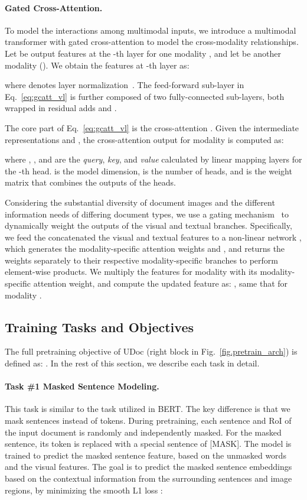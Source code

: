 \documentclass{article}
\begin{document}
	\paragraph{Gated Cross-Attention.}
	To model the {interactions among} multimodal inputs, we introduce {a} multimodal transformer {with gated cross-attention to model the cross-modality relationships.}
	{Let  be output features at the -th layer for one modality , and {let}  be another modality (). We obtain the features at -th layer as}:
	
	{where  denotes layer normalization~\cite{ba2016layer}}.
	{The feed-forward sub-layer  in Eq.~\ref{eq:gcatt_vl} is further composed of two fully-connected sub-layers, both wrapped in residual adds and .}
	
	The core part of Eq.~\ref{eq:gcatt_vl} is the cross-attention . Given the intermediate representations  and , the cross-attention output for modality  is computed as:
	
	{where , , and  are the {\textit{query}}, {\textit{key}}, and {\textit{value}} calculated by linear mapping layers for the -th head.  is the model dimension,  is the number of heads, and  is the weight matrix that combines the outputs of the heads.}
	
	Considering the {substantial diversity} of document images {and {the different information needs of differing} document types}, we use a gating mechanism~\cite{hu2018squeeze} to {dynamically weight} the outputs {of {the} visual and textual branches}. Specifically, {we feed the concatenated the visual and textual features to a non-linear network} , {which generates the modality-specific attention weights}  and , and returns the weights separately to {their respective modality-specific branches to perform element-wise products. We multiply the features for modality  with its modality-specific attention weight, and compute the {updated} feature as: , same that for modality .}
	
	\subsection{Training Tasks and Objectives}\label{sec:pre_training_tasks}
	The full pretraining objective of UDoc (right block in Fig.~\ref{fig.pretrain_arch})  is defined as: . {In the rest of this section}, we describe each task in detail.
	
	\paragraph{Task \#1 Masked Sentence Modeling.}
	This task is similar to the  task utilized in BERT. The key difference is that we mask sentence{s} instead of tokens. During pretraining, each sentence and RoI {of} the input document is randomly {and independently} masked. For the masked sentence, its token is replaced with a special sentence of [MASK]. The model is trained to predict the masked sentence feature, based on the unmasked words and the visual features. The goal is to predict {the} masked sentence embedding{s} based on the {contextual information from} {the} surrounding sentences and image regions, by minimizing the smooth {L1} loss \cite{girshick2015fast}:
	
\end{document}
